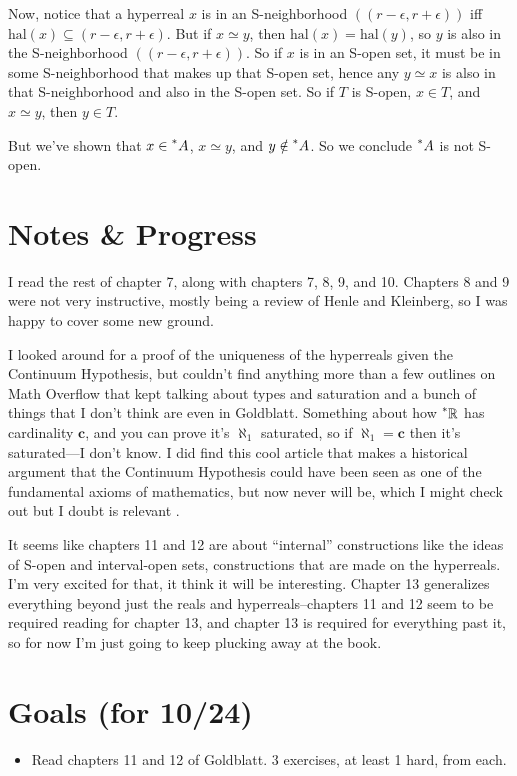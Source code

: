 \documentclass{article}
\newcommand{\hal}[1]{\mathrm{hal}(#1)}
\newcommand{\hreals}{\prescript{*}{}{\mathbb{R}}}
\newcommand{\hr}[1]{\prescript{*}{}{#1}}
\begin{document}
Now, notice that a hyperreal $x$ is in an S-neighborhood $((r - \epsilon, r + \epsilon))$ iff $\hal{x} \subseteq (r - \epsilon, r + \epsilon)$. But if $x \simeq y$, then $\hal{x} = \hal{y}$, so $y$ is also in the S-neighborhood $((r - \epsilon, r + \epsilon))$. So if $x$ is in an S-open set, it must be in some S-neighborhood that makes up that S-open set, hence any $y \simeq x$ is also in that S-neighborhood and also in the S-open set. So if $T$ is S-open, $x \in T$, and $x \simeq y$, then $y \in T$.

But we've shown that $x \in \hr{A}$, $x \simeq y$, and $y \notin \hr{A}$. So we conclude $\hr{A}$ is not S-open.

\section*{Notes \& Progress}
I read the rest of chapter 7, along with chapters 7, 8, 9, and 10. Chapters 8 and 9 were not very instructive, mostly being a review of Henle and Kleinberg, so I was happy to cover some new ground.

I looked around for a proof of the uniqueness of the hyperreals given the Continuum Hypothesis, but couldn't find anything more than a few outlines on Math Overflow that kept talking about types and saturation and a bunch of things that I don't think are even in Goldblatt. Something about how $\hreals$ has cardinality $\mathbf{c}$, and you can prove it's $\aleph_1$ saturated, so if $\aleph_1 = \mathbf{c}$ then it's saturated---I don't know. I did find this cool article that makes a historical argument that the Continuum Hypothesis could have been seen as one of the fundamental axioms of mathematics, but now never will be, which I might check out but I doubt is relevant \cite{hamkins2024}.

It seems like chapters 11 and 12 are about ``internal'' constructions like the ideas of S-open and interval-open sets, constructions that are made on the hyperreals. I'm very excited for that, it think it will be interesting. Chapter 13 generalizes everything beyond just the reals and hyperreals--chapters 11 and 12 seem to be required reading for chapter 13, and chapter 13 is required for everything past it, so for now I'm just going to keep plucking away at the book. 

\section*{Goals (for 10/24)}
\begin{itemize}
    \item Read chapters 11 and 12 of Goldblatt. 3 exercises, at least 1 hard, from each.
\end{itemize}

\printbibliography[title={Things I'm Looking At}]
\end{document}
